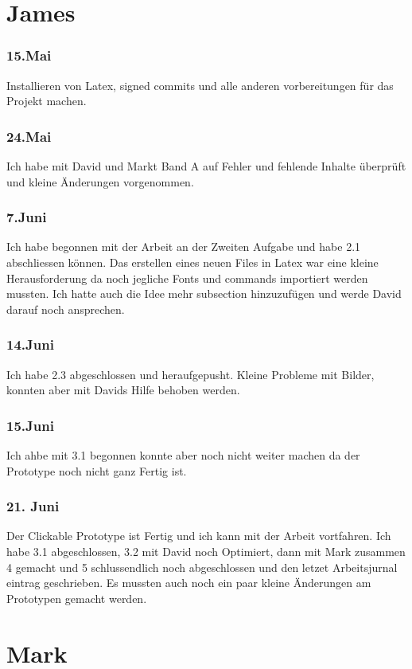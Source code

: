 \documentclass[10pt]{article}
\begin{document}
			
			
	\section{James}
	\subsubsection{15.Mai}
	Installieren von Latex, signed commits und alle anderen vorbereitungen für das Projekt machen.
	\subsubsection{24.Mai}
	Ich habe mit David und Markt Band A auf Fehler und fehlende Inhalte überprüft und kleine Änderungen vorgenommen.
	\subsubsection{7.Juni}
	Ich habe begonnen mit der Arbeit an der Zweiten Aufgabe und habe 2.1 abschliessen können. Das erstellen eines neuen Files in Latex war eine kleine Herausforderung da noch jegliche Fonts und commands importiert werden mussten. Ich hatte auch die Idee mehr subsection hinzuzufügen und werde David darauf noch ansprechen.
	\subsubsection{14.Juni}
	Ich habe 2.3 abgeschlossen und heraufgepusht. Kleine Probleme mit Bilder, konnten aber mit Davids Hilfe behoben werden.
	\subsubsection{15.Juni}
	Ich ahbe mit 3.1 begonnen konnte aber noch nicht weiter machen da der Prototype noch nicht ganz Fertig ist.
	\subsubsection{21. Juni}
	Der Clickable Prototype ist Fertig und ich kann mit der Arbeit vortfahren. Ich habe 3.1 abgeschlossen, 3.2 mit David noch Optimiert, dann mit Mark zusammen 4 gemacht und 5 schlussendlich noch abgeschlossen und den letzet Arbeitsjurnal eintrag geschrieben. Es mussten auch noch ein paar kleine Änderungen am Prototypen gemacht werden.
	\section{Mark}
\end{document}

